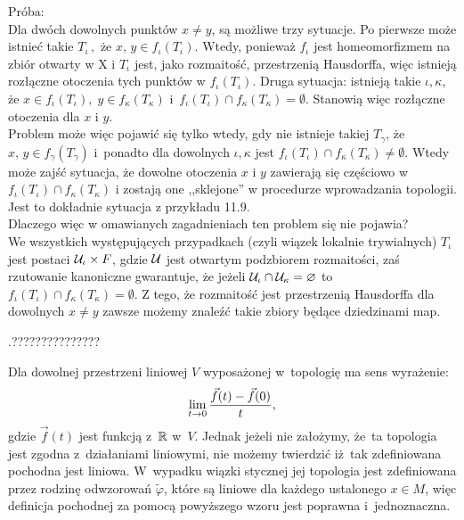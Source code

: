 \documentclass[a4paper,11pt]{article}
\begin{document}
Próba: \\
Dla dwóch dowolnych punktów $x \neq y$, są możliwe trzy sytuacje. Po
pierwsze może istnieć takie $T_{ \iota } \, ,$ że
$x, \, y \in f_{ \iota }( T_{ \iota } )$. Wtedy, ponieważ
$f_{ \iota }$ jest homeomorfizmem na zbiór otwarty w X i $T_{ \iota }$
jest, jako rozmaitość, przestrzenią Hausdorffa, więc istnieją
rozłączne otoczenia tych punktów w $f_{ \iota } ( T_{ \iota } )$.
Druga sytuacja: istnieją takie $\iota, \kappa$, że
$x \in f_{ \iota } ( T_{ \iota } ), \; y \in f_{ \kappa } ( T_{ \kappa
} )$
i~$f_{ \iota } ( T_{ \iota } ) \cap f_{ \kappa } ( T_{ \kappa } ) =
\emptyset$.
Stanowią więc rozłączne otoczenia dla $x$ i $y$. \\
Problem może więc pojawić się tylko wtedy, gdy nie istnieje takiej
$T_{ \gamma }$, że $x, \, y \in f_{ \gamma }( T_{ \gamma } )$
i~ponadto dla dowolnych $\iota, \kappa$ jest
$f_{ \iota } ( T_{ \iota } ) \cap f_{ \kappa } ( T_{ \kappa } ) \neq
\emptyset$. Wtedy może zajść sytuacja, że dowolne otoczenia $x$ i $y$
zawierają się częściowo w
$f_{ \iota } ( T_{ \iota } ) \cap f_{ \kappa } ( T_{ \kappa } )$ i
zostają one ,,sklejone'' w procedurze wprowadzania topologii. Jest to
dokładnie sytuacja z
przykładu 11.9.\\
Dlaczego więc w omawianych zagadnieniach ten problem się nie
pojawia?\\ We wszystkich występujących przypadkach (czyli wiązek
lokalnie trywialnych) $T_{ \iota }$ jest postaci
$\mathcal{ U }_{ \iota } \times F$, gdzie $\mathcal{ U }$ jest otwartym
podzbiorem rozmaitości, zaś rzutowanie kanoniczne gwarantuje, że
jeżeli $\mathcal{ U }_{ \iota } \cap \mathcal{ U }_{ \kappa } = \varnothing$ to
$f_{ \iota } (T_{ \iota }) \cap f_{ \kappa }(T_{ \kappa }) =
\emptyset$. Z tego, że rozmaitość jest przestrzenią Hausdorffa dla
dowolnych $x \neq y$ zawsze możemy znaleźć takie zbiory będące
dziedzinami map.

\vspace{\spaceFour}


\start {} .???????????????

\vspace{\spaceFour}


\start {} Dla dowolnej przestrzeni liniowej $V$ wyposażonej
w~topologię ma sens wyrażenie:
\begin{equation*}
  \lim\limits_{ t \to 0 } \frac{ \vec{ f }( t ) - \vec{ f }( 0 ) }{ t },
\end{equation*}
gdzie $\vec{ f }( t )$ jest funkcją z~$\mathbb{R}$ w~$V$. Jednak jeżeli
nie założymy, że~ta topologia jest zgodna z~działaniami liniowymi, nie
możemy twierdzić iż~tak zdefiniowana pochodna jest liniowa. W~wypadku
wiązki stycznej jej topologia jest zdefiniowana przez rodzinę
odwzorowań $\widetilde{ \varphi }$, które są liniowe dla każdego
ustalonego $x \in M$, więc definicja pochodnej za pomocą powyższego
wzoru jest poprawna i~jednoznaczna.
\end{document}

